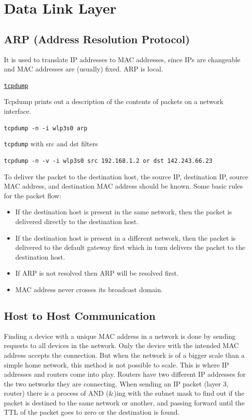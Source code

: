 \documentclass{article}
\begin{document}
\section*{Data Link Layer}

\subsection*{ARP (Address Resolution Protocol)}
It is used to translate IP addresses to MAC addresses, since IPs are changeable and MAC addresses are (usually) fixed. ARP is local.

\href{https://www.tcpdump.org/manpages/tcpdump.1.html}{\texttt{tcpdump}}

Tcpdump prints out a description of the contents of packets on a network interface.

\texttt{tcpdump -n -i wlp3s0 arp}

\texttt{tcpdump} with src and dst filters

\texttt{tcpdump -n -v -i wlp3s0 src 192.168.1.2 or dst 142.243.66.23}

To deliver the packet to the destination host, the source IP, destination IP, source MAC address, and destination MAC address should be known. Some basic rules for the packet flow:

\begin{itemize}
    \item If the destination host is present in the same network, then the packet is delivered directly to the destination host.
    \item If the destination host is present in a different network, then the packet is delivered to the default gateway first which in turn delivers the packet to the destination host.
    \item If ARP is not resolved then ARP will be resolved first.
    \item MAC address never crosses its broadcast domain.
\end{itemize}

\subsection*{Host to Host Communication}

Finding a device with a unique MAC address in a network is done by sending requests to all devices in the network. Only the device with the intended MAC address accepts the connection. But when the network is of a bigger scale than a simple home network, this method is not possible to scale. This is where IP addresses and routers come into play. Routers have two different IP addresses for the two networks they are connecting. When sending an IP packet (layer 3, router) there is a process of AND (\&)ing with the subnet mask to find out if the packet is destined to the same network or another, and passing forward until the TTL of the packet goes to zero or the destination is found.
\end{document}
